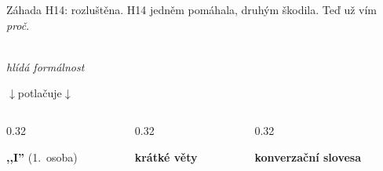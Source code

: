 \documentclass[aspectratio=169,10pt]{beamer}
\begin{document}
\begin{frame}[t]{Záhada H14: rozluštěna.}
  \vspace{2mm}
  {\small H14 jedněm pomáhala, druhým škodila. Teď už vím \emph{proč}.}\par\vspace{5mm}

  \begin{center}
    \begin{h14box}
      \\[0.5mm]
      {\scriptsize\color{mutedText}\itshape hlídá formálnost}
    \end{h14box}
  \end{center}
  \vspace{1mm}
  \begin{center}{\large\color{mutedText}$\downarrow$\;potlačuje\;$\downarrow$}\end{center}
  \vspace{1mm}

  \begin{columns}[c,onlytextwidth]
    \begin{column}{0.32\textwidth}
      \begin{featurebox}\centering\footnotesize\textbf{,,I''} (1.~osoba)\end{featurebox}
    \end{column}
    \begin{column}{0.32\textwidth}
      \begin{featurebox}\centering\footnotesize\textbf{krátké věty}\end{featurebox}
    \end{column}
    \begin{column}{0.32\textwidth}
      \begin{featurebox}\centering\footnotesize\textbf{konverzační slovesa}\end{featurebox}
    \end{column}
  \end{columns}
  \vspace{4mm}


\end{frame}
\end{document}
